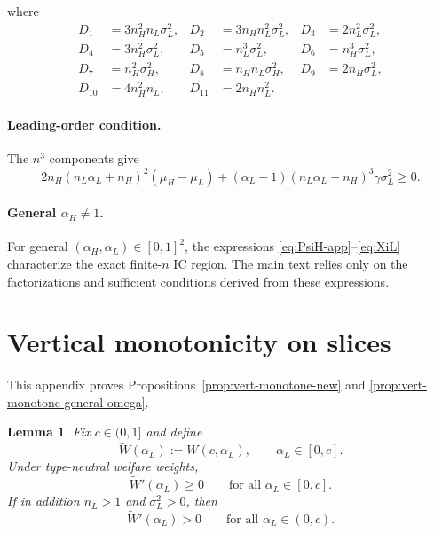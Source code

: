 \documentclass[a4paper,12pt]{article}
\newtheorem{lemma}[theorem]{Lemma}
\theoremstyle{definition}
\theoremstyle{remark}
\newcommand{\1}{\mathbf{1}}
\begin{document}
where
\begin{align*}
    D_1 &= 3 n_H^2 n_L \sigma_L^2, &
    D_2 &= 3 n_H n_L^2 \sigma_L^2, &
    D_3 &= 2 n_L^2 \sigma_L^2, \\
    D_4 &= 3 n_H^2 \sigma_L^2, &
    D_5 &= n_L^3 \sigma_L^2, &
    D_6 &= n_H^3 \sigma_L^2, \\
    D_7 &= n_H^2 \sigma_H^2, &
    D_8 &= n_H n_L \sigma_H^2, &
    D_9 &= 2 n_H \sigma_L^2, \\
    D_{10} &= 4 n_H^2 n_L, &
    D_{11} &= 2 n_H n_L^2.
\end{align*}

\paragraph{Leading-order condition.}
The $n^3$ components give
\begin{equation}\label{eq:IC-L-leading}
    2 n_H (n_L \alpha_L + n_H)^2 (\mu_H - \mu_L)
    + (\alpha_L - 1)(n_L \alpha_L + n_H)^3 \gamma \sigma_L^2 \ge 0.
\end{equation}

\paragraph{General $\alpha_H \neq 1$.}
For general $(\alpha_H,\alpha_L)\in[0,1]^2$, the expressions
\eqref{eq:PsiH-app}--\eqref{eq:XiL} characterize the exact finite-$n$ IC region.
The main text relies only on the factorizations and sufficient conditions
derived from these expressions.



\section{Vertical monotonicity on slices}
\label{app:vertical}

This appendix proves Propositions~\ref{prop:vert-monotone-new} and
\ref{prop:vert-monotone-general-omega}.



\begin{lemma}
\label{lem:vertical-type-neutral}
Fix \(c\in(0,1]\) and define
\[
\widetilde W(\alpha_L):=W(c,\alpha_L), \qquad \alpha_L\in[0,c].
\]
Under type-neutral welfare weights,
\[
\widetilde W'(\alpha_L)\ge 0
\qquad\text{for all }\alpha_L\in[0,c].
\]
If in addition \(n_L>1\) and \(\sigma_L^2>0\), then
\[
\widetilde W'(\alpha_L)>0
\qquad\text{for all }\alpha_L\in(0,c).
\]
\end{lemma}
\end{document}
